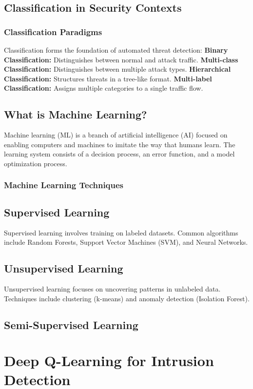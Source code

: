 \documentclass[16pt]{report}
\begin{document}
\section{Classification in Security Contexts}
\subsection{Classification Paradigms}
Classification forms the foundation of automated threat detection:
\textbf{Binary Classification:} Distinguishes between normal and attack traffic.
\textbf{Multi-class Classification:} Distinguishes between multiple attack types.
\textbf{Hierarchical Classification:} Structures threats in a tree-like format.
\textbf{Multi-label Classification:} Assigns multiple categories to a single traffic flow.

\section*{What is Machine Learning?}
Machine learning (ML) is a branch of artificial intelligence (AI) focused on enabling computers and machines to imitate the way that humans learn. The learning system consists of a decision process, an error function, and a model optimization process.

\subsection{Machine Learning Techniques}
\section*{Supervised Learning}
Supervised learning involves training on labeled datasets. Common algorithms include Random Forests, Support Vector Machines (SVM), and Neural Networks.

\section*{Unsupervised Learning}
Unsupervised learning focuses on uncovering patterns in unlabeled data. Techniques include clustering (k-means) and anomaly detection (Isolation Forest).

\section*{Semi-Supervised Learning}

\chapter{Deep Q-Learning for Intrusion Detection}
\label{chap:dqn-for-ids}
\end{document}
